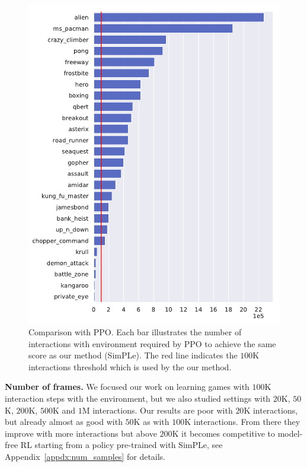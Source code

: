 \begin{figure}[t]
\centering
\includegraphics[width=1.0\columnwidth]{figures/v1_eval_longmodel_vs_ppo-1.png}
\caption{Comparison with PPO. Each bar illustrates the number of interactions with environment required by PPO to achieve the same score as our method (SimPLe). The red line indicates the $100$K interactions threshold which is used by the our method.}
\label{fig:compare_ppo}
\end{figure}

\textbf{Number of frames.} We focused our work on learning games with $100$K interaction steps with the environment, but we also studied settings with $20$K, $50$K, $200$K, $500$K and $1$M interactions. Our results are poor with $20$K interactions, but already almost as good with $50$K as with $100$K interactions. From there they improve with more interactions but above $200$K it becomes competitive to model-free RL starting from a policy pre-trained with SimPLe, see Appendix~\ref{appdx:num_samples} for details.


